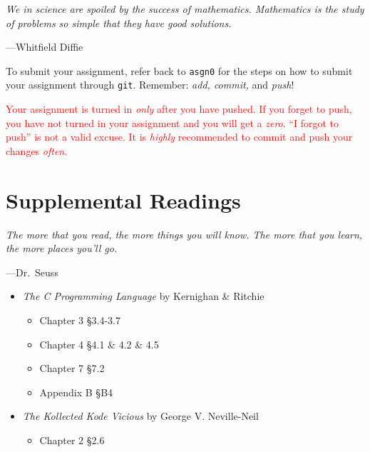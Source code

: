 \documentclass[11pt]{article}
\begin{document}
\epigraph{\emph{We in science are spoiled by the success of mathematics.
Mathematics is the study of problems so simple that they have good
solutions.}}{---Whitfield Diffie}

To submit your assignment, refer back to \texttt{asgn0} for the steps on how to
submit your assignment through \texttt{git}. Remember: \emph{add, commit,} and
\emph{push}!

\textcolor{red}{Your assignment is turned in \emph{only} after you have pushed.
If you forget to push, you have not turned in your assignment and you will get a
\emph{zero}. ``I forgot to push'' is not a valid excuse. It is \emph{highly}
recommended to commit and push your changes \emph{often}.}


\section{Supplemental Readings}

\epigraph{\emph{The more that you read, the more things you will know. The
more that you learn, the more places you'll go.}}{---Dr.\ Seuss}\noindent

\begin{itemize}
  \item \textit{The C Programming Language} by Kernighan \& Ritchie
  \begin{itemize}
    \item Chapter 3 \S 3.4-3.7
    \item Chapter 4 \S 4.1 \& 4.2 \& 4.5
    \item Chapter 7 \S 7.2
    \item Appendix B \S B4
  \end{itemize}

  \item \textit{The Kollected Kode Vicious } by George V. Neville-Neil
  \begin{itemize}
      \item Chapter 2 \S 2.6
  \end{itemize}
\end{itemize}
\end{document}
